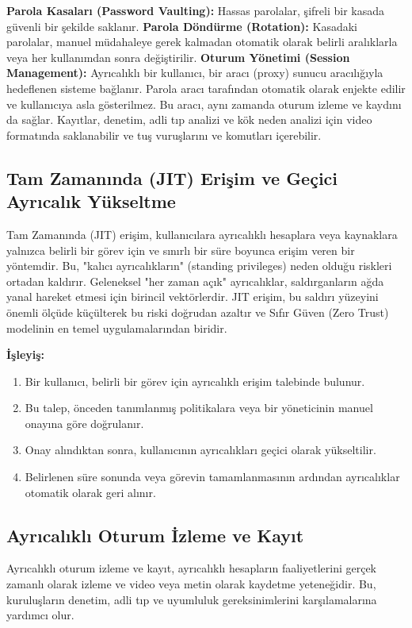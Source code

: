 \textbf{Parola Kasaları (Password Vaulting):} Hassas parolalar, şifreli bir kasada güvenli bir şekilde saklanır.
\textbf{Parola Döndürme (Rotation):} Kasadaki parolalar, manuel müdahaleye gerek kalmadan otomatik olarak belirli aralıklarla veya her kullanımdan sonra değiştirilir.
\textbf{Oturum Yönetimi (Session Management):} Ayrıcalıklı bir kullanıcı, bir aracı (proxy) sunucu aracılığıyla hedeflenen sisteme bağlanır. Parola aracı tarafından otomatik olarak enjekte edilir ve kullanıcıya asla gösterilmez. Bu aracı, aynı zamanda oturum izleme ve kaydını da sağlar. Kayıtlar, denetim, adli tıp analizi ve kök neden analizi için video formatında saklanabilir ve tuş vuruşlarını ve komutları içerebilir.

\subsection{Tam Zamanında (JIT) Erişim ve Geçici Ayrıcalık Yükseltme}

Tam Zamanında (JIT) erişim, kullanıcılara ayrıcalıklı hesaplara veya kaynaklara yalnızca belirli bir görev için ve sınırlı bir süre boyunca erişim veren bir yöntemdir. Bu, "kalıcı ayrıcalıkların" (standing privileges) neden olduğu riskleri ortadan kaldırır. Geleneksel "her zaman açık" ayrıcalıklar, saldırganların ağda yanal hareket etmesi için birincil vektörlerdir. JIT erişim, bu saldırı yüzeyini önemli ölçüde küçülterek bu riski doğrudan azaltır ve Sıfır Güven (Zero Trust) modelinin en temel uygulamalarından biridir.

\textbf{İşleyiş:}
\begin{enumerate}
    \item Bir kullanıcı, belirli bir görev için ayrıcalıklı erişim talebinde bulunur.
    \item Bu talep, önceden tanımlanmış politikalara veya bir yöneticinin manuel onayına göre doğrulanır.
    \item Onay alındıktan sonra, kullanıcının ayrıcalıkları geçici olarak yükseltilir.
    \item Belirlenen süre sonunda veya görevin tamamlanmasının ardından ayrıcalıklar otomatik olarak geri alınır.
\end{enumerate}

\subsection{Ayrıcalıklı Oturum İzleme ve Kayıt}

Ayrıcalıklı oturum izleme ve kayıt, ayrıcalıklı hesapların faaliyetlerini gerçek zamanlı olarak izleme ve video veya metin olarak kaydetme yeteneğidir. Bu, kuruluşların denetim, adli tıp ve uyumluluk gereksinimlerini karşılamalarına yardımcı olur.

